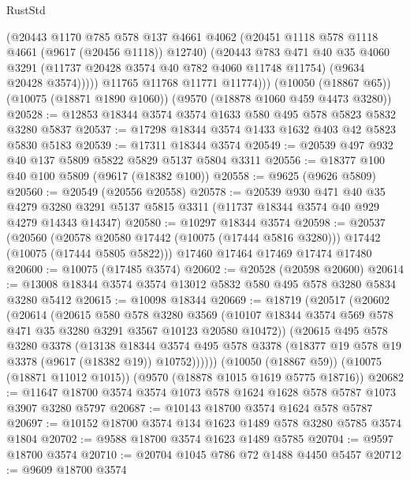 \begin{lexlean}{RustStd}
\begin{coremodule}
{\begin{coremodule}
{{{{{{{{{{{{{{{{{{{{{{{{{{{{{{{{{              (@20443
                @1170
                @785
                @578
                @137
                @4661
                @4062
                (@20451 @1118 @578 @1118 @4661 (@9617 (@20456 @1118)) @12740)
                (@20443
                  @783
                  @471
                  @40
                  @35
                  @4060
                  @3291
                  (@11737 @20428 @3574 @40 @782 @4060 @11748 @11754)
                  (@9634 @20428 @3574)))))
          @11765
          @11768
          @11771
          @11774)))
    (@10050 (@18867 @65))
    (@10075 (@18871 @1890 @1060))
    (@9570 (@18878 @1060 @459 @4473 @3280))
@20528 := @12853 @18344 @3574 @3574 @1633 @580 @495 @578 @5823 @5832 @3280 @5837
@20537 := @17298 @18344 @3574 @1433 @1632 @403 @42 @5823 @5830 @5183
@20539 := @17311 @18344 @3574
@20549 := @20539 @497 @932 @40 @137 @5809 @5822 @5829 @5137 @5804 @3311
@20556 := @18377 @100 @40 @100 @5809 (@9617 (@18382 @100))
@20558 := @9625 (@9626 @5809)
@20560 := @20549 (@20556 @20558)
@20578 := @20539
    @930
    @471
    @40
    @35
    @4279
    @3280
    @3291
    @5137
    @5815
    @3311
    (@11737 @18344 @3574 @40 @929 @4279 @14343 @14347)
@20580 := @10297 @18344 @3574
@20598 := @20537
    (@20560
      (@20578 @20580 @17442 (@10075 (@17444 @5816 @3280)))
      @17442
      (@10075 (@17444 @5805 @5822)))
    @17460
    @17464
    @17469
    @17474
    @17480
@20600 := @10075 (@17485 @3574)
@20602 := @20528 (@20598 @20600)
@20614 := @13008 @18344 @3574 @3574 @13012 @5832 @580 @495 @578 @3280 @5834 @3280 @5412
@20615 := @10098 @18344
@20669 := @18719
    (@20517
      (@20602
        (@20614
          (@20615
            @580
            @578
            @3280
            @3569
            (@10107 @18344 @3574 @569 @578 @471 @35 @3280 @3291 @3567 @10123 @20580 @10472))
          (@20615
            @495
            @578
            @3280
            @3378
            (@13138
              @18344
              @3574
              @495
              @578
              @3378
              (@18377 @19 @578 @19 @3378 (@9617 (@18382 @19)) @10752))))))
    (@10050 (@18867 @59))
    (@10075 (@18871 @11012 @1015))
    (@9570 (@18878 @1015 @1619 @5775 @18716))
@20682 := @11647 @18700 @3574 @3574 @1073 @578 @1624 @1628 @578 @5787 @1073 @3907 @3280 @5797
@20687 := @10143 @18700 @3574 @1624 @578 @5787
@20697 := @10152 @18700 @3574 @134 @1623 @1489 @578 @3280 @5785 @3574 @1804
@20702 := @9588 @18700 @3574 @1623 @1489 @5785
@20704 := @9597 @18700 @3574
@20710 := @20704 @1045 @786 @72 @1488 @4450 @5457
@20712 := @9609 @18700 @3574
}}}}}}}}}}}}}}}}}}}}}}}}}}}}}}}}}
\end{coremodule}}
\end{coremodule}
\end{lexlean}
